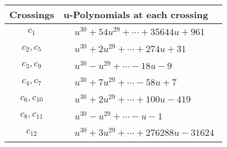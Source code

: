 \documentclass[1p]{elsarticle_modified}
\theoremstyle{definition}
\begin{document}
\begin{tabular}{m{50pt}|m{274pt}}
Crossings & \hspace{64pt}u-Polynomials at each crossing \\
\hline $$\begin{aligned}c_{1}\end{aligned}$$&$\begin{aligned}
&u^{30}+54 u^{29}+\cdots+35644 u+961
\end{aligned}$\\
\hline $$\begin{aligned}c_{2},c_{5}\end{aligned}$$&$\begin{aligned}
&u^{30}+2 u^{29}+\cdots+274 u+31
\end{aligned}$\\
\hline $$\begin{aligned}c_{3},c_{9}\end{aligned}$$&$\begin{aligned}
&u^{30}- u^{29}+\cdots-18 u-9
\end{aligned}$\\
\hline $$\begin{aligned}c_{4},c_{7}\end{aligned}$$&$\begin{aligned}
&u^{30}+7 u^{29}+\cdots-58 u+7
\end{aligned}$\\
\hline $$\begin{aligned}c_{6},c_{10}\end{aligned}$$&$\begin{aligned}
&u^{30}+2 u^{29}+\cdots+100 u-419
\end{aligned}$\\
\hline $$\begin{aligned}c_{8},c_{11}\end{aligned}$$&$\begin{aligned}
&u^{30}- u^{29}+\cdots- u-1
\end{aligned}$\\
\hline $$\begin{aligned}c_{12}\end{aligned}$$&$\begin{aligned}
&u^{30}+3 u^{29}+\cdots+276288 u-31624
\end{aligned}$\\
\hline
\end{tabular}\\~\\
\newpage\renewcommand{\arraystretch}{1}
\end{document}
